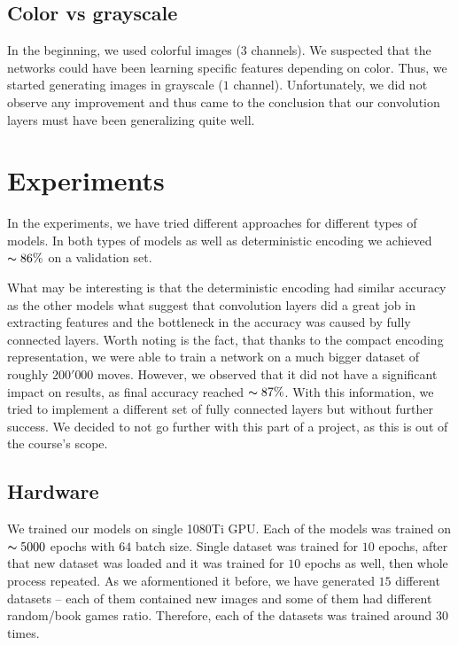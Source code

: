 \documentclass[10pt,twocolumn,letterpaper]{article}
\begin{document}
\subsection{Color vs grayscale}

In the beginning, we used colorful images ($3$ channels). We suspected that the
networks could have been learning specific features depending on color. Thus, we
started generating images in grayscale ($1$ channel). Unfortunately, we did not
observe any improvement and thus came to the conclusion that our convolution
layers must have been generalizing quite well.

\section{Experiments}

In the experiments, we have tried different approaches for different types of
models. In both types of models as well as deterministic encoding we achieved
$\thicksim 86\%$ on a validation set.

What may be interesting is that the deterministic encoding had similar accuracy
as the other models what suggest that convolution layers did a great job in
extracting features and the bottleneck in the accuracy was caused by fully
connected layers. Worth noting is the fact, that thanks to the compact encoding
representation, we were able to train a network on a much bigger dataset of
roughly $200'000$ moves. However, we observed that it did not have a significant
impact on results, as final accuracy reached $\thicksim 87\%$. With this
information, we tried to implement a different set of fully connected layers but
without further success. We decided to not go further with this part of a
project, as this is out of the course's scope.

\subsection{Hardware}

We trained our models on single 1080Ti GPU. Each of the models was trained on
$\thicksim 5000$ epochs with $64$ batch size. Single dataset was trained for
$10$ epochs, after that new dataset was loaded and it was trained for $10$
epochs as well, then whole process repeated. As we aformentioned it before, we
have generated $15$ different datasets -- each of them contained new images and
some of them had different random/book games ratio. Therefore, each of the
datasets was trained around $30$ times.
\end{document}
